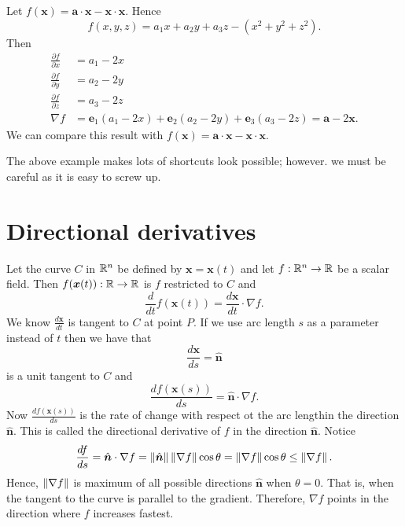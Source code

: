 \begin{example}
    Let 
    $f(\bm x) = \bm a \cdot \bm x - \bm x \cdot \bm x.$ 
    Hence
    \[ f(x, y, z) = a_1x + a_2y + a_3z - (x^2 + y^2 + z^2). \]
    Then
    \begin{align*}
        \frac{\partial f}{\partial x} &= a_1 - 2x \\
        \frac{\partial f}{\partial y} &= a_2 - 2y \\
        \frac{\partial f}{\partial z} &= a_3 - 2z \\
        \nabla f &= \bm e_1(a_1 - 2x) + \bm e_2(a_2 - 2y) + \bm e_3(a_3 - 2z) = \bm a - 2\bm x.
    \end{align*}
    We can compare this result with $f(\bm x) = \bm a \cdot \bm x - \bm x \cdot \bm x$.
\end{example}

\begin{remark}
    The above example makes lots of shortcuts look possible; however. we must be careful as it is easy to screw up.
\end{remark}

\section{Directional derivatives}


Let the curve $C$ in $\mathbb{R}^n$ be defined by $\bm x = \bm x(t)$ and let $f: \mathbb{R}^n \to \mathbb{R}$ be a scalar field. Then $f(\bm x(t)): \mathbb{R} \to \mathbb{R}$ is $f$ restricted to $C$ and
\[ \frac{d}{dt} f(\bm x(t)) = \frac{d\bm x}{dt} \cdot \nabla f. \]
We know $\frac{d\bm x}{dt}$ is tangent to $C$ at point $P$. If we use  arc length $s$ as a parameter instead of $t$ then we have that
\[ \frac{d\bm x}{ds} = \hat{\bm n} \]
is a unit tangent to $C$ and
\[ \frac{df(\bm x(s))}{ds} = \hat{\bm n} \cdot \nabla f. \]
Now $\frac{df(\bm x(s))}{ds}$ is the rate of change with respect ot the arc lengthin the direction $\hat{\bm n}$. This is called the directional derivative of $f$ in the direction $\hat{\bm n}$. Notice
\[ \frac{df}{ds} = \hat{\bm n} \cdot \nabla f = \left\lVert\hat{\bm n}\right\rVert \left\lVert\nabla f\right\rVert \cos{\theta} = \left\lVert\nabla f\right\rVert \cos{\theta} \leq \left\lVert\nabla f\right\rVert. \]
Hence, $\left\lVert\nabla f\right\rVert$ is maximum of all possible directions $\hat{\bm n}$ when $\theta = 0$. That is, when the tangent to the curve is parallel to the gradient. Therefore, $\nabla f$ points in the direction where $f$ increases fastest. 
